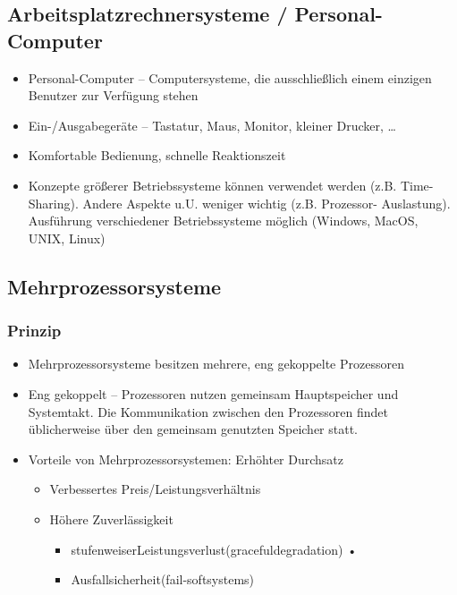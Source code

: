 \documentclass[11pt]{article}
\begin{document}
\subsection*{Arbeitsplatzrechnersysteme / Personal-Computer}
\label{sec:org8c81224}
\begin{itemize}
\item Personal-Computer – Computersysteme, die ausschließlich einem
einzigen Benutzer zur Verfügung stehen
\item Ein-/Ausgabegeräte – Tastatur, Maus, Monitor, kleiner Drucker, \ldots{}
\item Komfortable Bedienung, schnelle Reaktionszeit
\item Konzepte größerer Betriebssysteme können verwendet werden
(z.B. Time-Sharing). Andere Aspekte u.U. weniger wichtig
(z.B. Prozessor- Auslastung). Ausführung verschiedener
Betriebssysteme möglich (Windows, MacOS, UNIX, Linux)
\end{itemize}
\subsection*{Mehrprozessorsysteme}
\label{sec:org8f6d8fe}
\subsubsection*{Prinzip}
\label{sec:orgb5a3cd7}
\begin{itemize}
\item Mehrprozessorsysteme besitzen mehrere, eng gekoppelte Prozessoren
\item Eng gekoppelt -- Prozessoren nutzen gemeinsam Hauptspeicher und
Systemtakt. Die Kommunikation zwischen den Prozessoren findet
üblicherweise über den gemeinsam genutzten Speicher statt.
\item Vorteile von Mehrprozessorsystemen: Erhöhter Durchsatz
\begin{itemize}
\item Verbessertes Preis/Leistungsverhältnis
\item Höhere Zuverlässigkeit
\begin{itemize}
\item stufenweiserLeistungsverlust(gracefuldegradation) •
\item Ausfallsicherheit(fail-softsystems)
\end{itemize}
\end{itemize}
\end{itemize}
\end{document}
